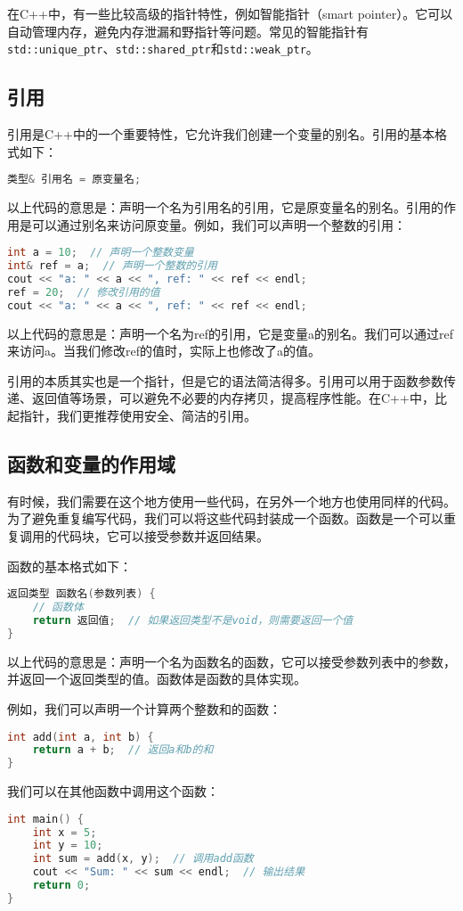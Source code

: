 \documentclass[../main.tex]{subfiles}
\begin{document}
在C++中，有一些比较高级的指针特性，例如智能指针（smart pointer）。它可以自动管理内存，避免内存泄漏和野指针等问题。常见的智能指针有\texttt{std::unique\_ptr}、\texttt{std::shared\_ptr}和\texttt{std::weak\_ptr}。

\subsection{引用}

引用是C++中的一个重要特性，它允许我们创建一个变量的别名。引用的基本格式如下：
\begin{lstlisting}[language=C++]
类型& 引用名 = 原变量名;
\end{lstlisting}
以上代码的意思是：声明一个名为引用名的引用，它是原变量名的别名。引用的作用是可以通过别名来访问原变量。例如，我们可以声明一个整数的引用：
\begin{lstlisting}[language=C++]
int a = 10;  // 声明一个整数变量
int& ref = a;  // 声明一个整数的引用
cout << "a: " << a << ", ref: " << ref << endl;
ref = 20;  // 修改引用的值
cout << "a: " << a << ", ref: " << ref << endl;
\end{lstlisting}

以上代码的意思是：声明一个名为ref的引用，它是变量a的别名。我们可以通过ref来访问a。当我们修改ref的值时，实际上也修改了a的值。

引用的本质其实也是一个指针，但是它的语法简洁得多。引用可以用于函数参数传递、返回值等场景，可以避免不必要的内存拷贝，提高程序性能。在C++中，比起指针，我们更推荐使用安全、简洁的引用。

\subsection{函数和变量的作用域}

有时候，我们需要在这个地方使用一些代码，在另外一个地方也使用同样的代码。为了避免重复编写代码，我们可以将这些代码封装成一个函数。函数是一个可以重复调用的代码块，它可以接受参数并返回结果。

函数的基本格式如下：
\begin{lstlisting}[language=C++]
返回类型 函数名(参数列表) {
    // 函数体
    return 返回值;  // 如果返回类型不是void，则需要返回一个值
}
\end{lstlisting}
以上代码的意思是：声明一个名为函数名的函数，它可以接受参数列表中的参数，并返回一个返回类型的值。函数体是函数的具体实现。

例如，我们可以声明一个计算两个整数和的函数：
\begin{lstlisting}[language=C++]
int add(int a, int b) {
    return a + b;  // 返回a和b的和
}
\end{lstlisting}
我们可以在其他函数中调用这个函数：
\begin{lstlisting}[language=C++]
int main() {
    int x = 5;
    int y = 10;
    int sum = add(x, y);  // 调用add函数
    cout << "Sum: " << sum << endl;  // 输出结果
    return 0;
}
\end{lstlisting}
\end{document}
